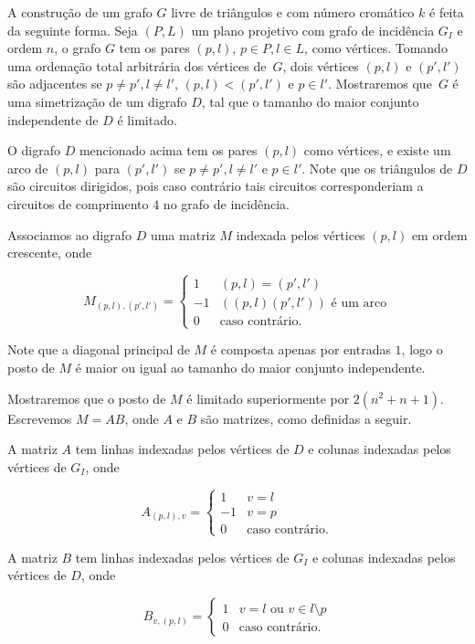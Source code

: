 A construção de um grafo $G$ livre de triângulos e com número cromático $k$ é feita da seguinte forma. Seja $(P,L)$ um plano projetivo com grafo de incidência $G_I$ e ordem $n$, o grafo $G$ tem os pares $(p,l)$, $p\in P, l\in L$, como vértices. Tomando uma ordenação total arbitrária dos vértices de~$G$, dois vértices $(p,l)$ e $(p',l')$ são adjacentes se $p \neq p', l \neq l'$, $(p,l) < (p',l')$ e $p \in l'$. Mostraremos que~$G$ é uma simetrização de um digrafo $D$, tal que o tamanho do maior conjunto independente de $D$ é limitado.

O digrafo $D$ mencionado acima tem os pares $(p,l)$ como vértices, e existe um arco de $(p,l)$ para $(p',l')$ se $p \neq p', l \neq l'$ e $p\in l'$. Note que os triângulos de $D$ são circuitos dirigidos, pois caso contrário tais circuitos corresponderiam a circuitos de comprimento $4$ no grafo de incidência.

Associamos ao digrafo $D$ uma matriz $M$ indexada pelos vértices $(p,l)$ em ordem crescente, onde

\[ M_{(p,l),(p',l')} = \begin{cases} 
      1 & (p,l) = (p',l') \\
      -1 & ((p,l)(p',l')) \text{ é um arco} \\
      0 & \text{caso contrário.}
   \end{cases}
\]

Note que a diagonal principal de $M$ é composta apenas por entradas $1$, logo o posto de $M$ é maior ou igual ao tamanho do maior conjunto independente.

Mostraremos que o posto de $M$ é limitado superiormente por $2(n^2 + n + 1)$. Escrevemos $M = AB$, onde $A$ e $B$ são matrizes, como definidas a seguir.

A matriz $A$ tem linhas indexadas pelos vértices de $D$ e colunas indexadas pelos vértices de $G_I$, onde

\[ A_{(p,l),v} = \begin{cases} 
      1 & v = l \\
      -1 & v = p \\
      0 & \text{caso contrário.}
   \end{cases}
\]

A matriz $B$ tem linhas indexadas pelos vértices de $G_I$ e colunas indexadas pelos vértices de $D$, onde

\[ B_{v,(p,l)} = \begin{cases} 
      1 & v = l \text{ ou } v\in l \setminus p\\
      0 & \text{caso contrário.}
   \end{cases}
\]

